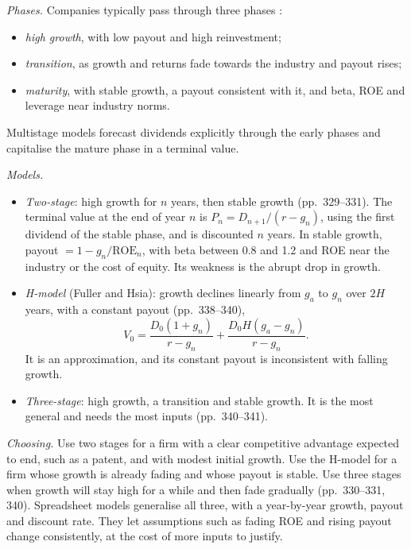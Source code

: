 \begin{qfmethod}\label{meth:multistage-ddm}
 \emph{Phases.} Companies typically pass through three phases \citep[pp.~329--331, 340--341]{investment-valuation-2012}:
\begin{itemize}
\item \emph{high growth}, with low payout and high reinvestment;
\item \emph{transition}, as growth and returns fade towards the industry and payout rises;
\item \emph{maturity}, with stable growth, a payout consistent with it, and beta, ROE and leverage near industry norms.
\end{itemize}
Multistage models forecast dividends explicitly through the early phases and capitalise the mature phase in a terminal value.

\emph{Models.}
\begin{itemize}
\item \emph{Two-stage}: high growth for $n$ years, then stable growth (pp.~329--331). The terminal value at the end of year $n$ is $P_n=D_{n+1}/(r-g_n)$, using the first dividend of the stable phase, and is discounted $n$ years. In stable growth, payout $=1-g_n/\mathrm{ROE}_n$, with beta between 0.8 and 1.2 and ROE near the industry or the cost of equity. Its weakness is the abrupt drop in growth.
\item \emph{H-model} (Fuller and Hsia): growth declines linearly from $g_a$ to $g_n$ over $2H$ years, with a constant payout (pp.~338--340),
\[ V_0=\frac{D_0(1+g_n)}{r-g_n}+\frac{D_0H(g_a-g_n)}{r-g_n}. \]
It is an approximation, and its constant payout is inconsistent with falling growth.
\item \emph{Three-stage}: high growth, a transition and stable growth. It is the most general and needs the most inputs (pp.~340--341).
\end{itemize}

\emph{Choosing.} Use two stages for a firm with a clear competitive advantage expected to end, such as a patent, and with modest initial growth. Use the H-model for a firm whose growth is already fading and whose payout is stable. Use three stages when growth will stay high for a while and then fade gradually (pp.~330--331, 340). Spreadsheet models generalise all three, with a year-by-year growth, payout and discount rate. They let assumptions such as fading ROE and rising payout change consistently, at the cost of more inputs to justify.


\end{qfmethod}

